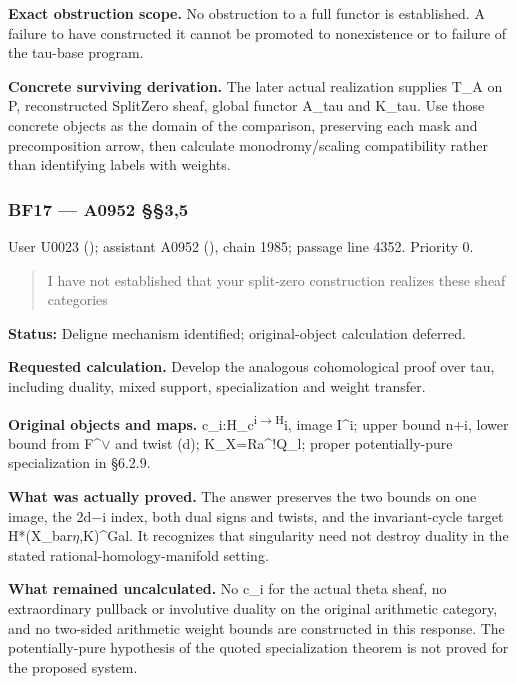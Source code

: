 \textbf{Exact obstruction scope.} No obstruction to a full functor is
established. A failure to have constructed it cannot be promoted to
nonexistence or to failure of the tau-base program.

\textbf{Concrete surviving derivation.} The later actual realization
supplies T\_A on P, reconstructed SplitZero sheaf, global functor A\_tau
and K\_tau. Use those concrete objects as the domain of the comparison,
preserving each mask and precomposition arrow, then calculate
monodromy/scaling compatibility rather than identifying labels with
weights.

\subsubsection{BF17 --- A0952 §§3,5}\label{TranscriptLedgerStage:bf17-a0952-35}

User U0023 (\protect{});
assistant A0952 (\protect{}),
chain 1985; passage line 4352. Priority 0.

\begin{quote}
I have not established that your split-zero construction realizes these
sheaf categories
\end{quote}

\textbf{Status:} Deligne mechanism identified; original-object
calculation deferred.

\textbf{Requested calculation.} Develop the analogous cohomological
proof over tau, including duality, mixed support, specialization and
weight transfer.

\textbf{Original objects and maps.}
c\_i:H\_c\textsuperscript{i\allowbreak{}\ensuremath{→}\allowbreak{}H}i,
image I\^{}i; upper bound n+i, lower bound from
F\textasciicircum{}\allowbreak{}\ensuremath{∨}\allowbreak{} and twist
(d); K\_X=Ra\^{}!Q\_l; proper potentially-pure specialization in §6.2.9.

\textbf{What was actually proved.} The answer preserves the two bounds
on one image, the 2d\allowbreak{}\ensuremath{−}\allowbreak{}i index,
both dual signs and twists, and the invariant-cycle target
H*(X\_bar\allowbreak{}\ensuremath{η}\allowbreak{},K)\textasciicircum{}Gal.
It recognizes that singularity need not destroy duality in the stated
rational-homology-manifold setting.

\textbf{What remained uncalculated.} No c\_i for the actual theta sheaf,
no extraordinary pullback or involutive duality on the original
arithmetic category, and no two-sided arithmetic weight bounds are
constructed in this response. The potentially-pure hypothesis of the
quoted specialization theorem is not proved for the proposed system.

